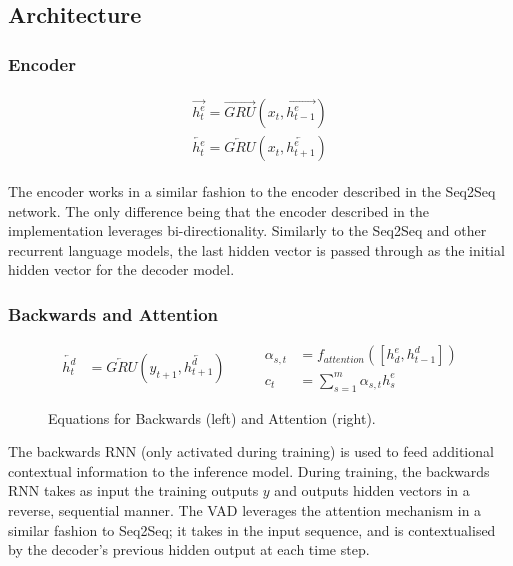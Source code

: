 \documentclass[12pt,twoside]{report}
\begin{document}
\subsection{Architecture}

\subsubsection{Encoder}

\begin{align}
\label{eqn:eqlabel}
\begin{split}
	\overrightarrow{h^e_t} = \overrightarrow{GRU}(x_t, \overrightarrow{h^e_{t-1}})
\\
\overleftarrow{h^e_t} = \overleftarrow{GRU}(x_t, \overleftarrow{h^e_{t+1}})
\end{split}
\end{align}

The encoder works in a similar fashion to the encoder described in the Seq2Seq network. The only difference being that the encoder described in the implementation leverages bi-directionality. Similarly to the Seq2Seq and other recurrent language models, the last hidden vector is passed through as the initial hidden vector for the decoder model.

\subsubsection{Backwards and Attention}


\begin{figure}[!ht]
	\label{eqn:eqback}
	\begin{equation}
		\begin{split}
			\overleftarrow{h^d_t} &= \overleftarrow{GRU}(y_{t+1}, \overleftarrow{h^d_{t+1}})
		\end{split}
		\quad\quad
		\begin{split}
			\alpha_{s,t} &= f_{attention}([h^e_d, h^d_{t-1}]) \\
			c_t &= \sum^m_{s=1}\alpha_{s,t} h^e_s
		\end{split}
	\end{equation}
	\caption{Equations for Backwards (left) and Attention (right).}
	\end{figure}


The backwards RNN (only activated during training) is used to feed additional contextual information to the inference model.  During training, the backwards RNN takes as input the training outputs $y$ and outputs hidden vectors in a reverse, sequential manner. The VAD leverages the attention mechanism in a similar fashion to Seq2Seq; it  takes in the input sequence, and is contextualised by the decoder's previous hidden output at each time step.
\end{document}
